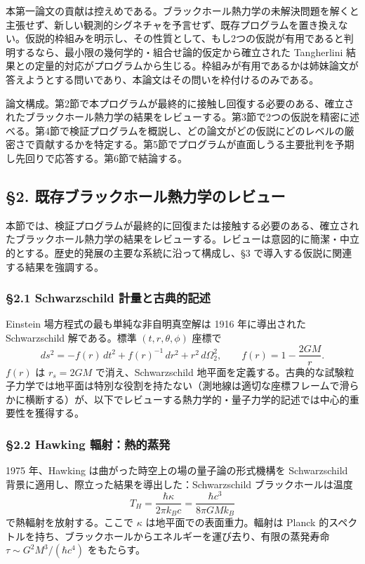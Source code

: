 \documentclass[a4paper,11pt]{ltjsarticle}
\theoremstyle{definition}
\begin{document}
本第一論文の貢献は控えめである。ブラックホール熱力学の未解決問題を解くと主張せず、新しい観測的シグネチャを予言せず、既存プログラムを置き換えない。仮説的枠組みを明示し、その性質として、もし2つの仮説が有用であると判明するなら、最小限の幾何学的・組合せ論的仮定から確立された
Tangherlini
結果との定量的対応がプログラムから生じる。枠組みが有用であるかは姉妹論文が答えようとする問いであり、本論文はその問いを枠付けるのみである。

論文構成。第2節で本プログラムが最終的に接触し回復する必要のある、確立されたブラックホール熱力学の結果をレビューする。第3節で2つの仮説を精密に述べる。第4節で検証プログラムを概説し、どの論文がどの仮説にどのレベルの厳密さで貢献するかを特定する。第5節でプログラムが直面しうる主要批判を予期し先回りで応答する。第6節で結論する。

\subsection{§2.
既存ブラックホール熱力学のレビュー}\label{ux65e2ux5b58ux30d6ux30e9ux30c3ux30afux30dbux30fcux30ebux71b1ux529bux5b66ux306eux30ecux30d3ux30e5ux30fc}

本節では、検証プログラムが最終的に回復または接触する必要のある、確立されたブラックホール熱力学の結果をレビューする。レビューは意図的に簡潔・中立的とする。歴史的発展の主要な系統に沿って構成し、§3
で導入する仮説に関連する結果を強調する。

\subsubsection{§2.1 Schwarzschild
計量と古典的記述}\label{schwarzschild-ux8a08ux91cfux3068ux53e4ux5178ux7684ux8a18ux8ff0}

Einstein 場方程式の最も単純な非自明真空解は 1916 年に導出された
Schwarzschild 解である。標準 \((t, r, \theta, \phi)\) 座標で
\[ds^2 = -f(r)\, dt^2 + f(r)^{-1}\, dr^2 + r^2 \, d\Omega_2^2, \qquad f(r) = 1 - \frac{2GM}{r}.\]
\(f(r)\) は \(r_s = 2GM\) で消え、Schwarzschild
地平面を定義する。古典的な試験粒子力学では地平面は特別な役割を持たない（測地線は適切な座標フレームで滑らかに横断する）が、以下でレビューする熱力学的・量子力学的記述では中心的重要性を獲得する。

\subsubsection{§2.2 Hawking
輻射：熱的蒸発}\label{hawking-ux8f3bux5c04ux71b1ux7684ux84b8ux767a}

1975 年、Hawking は曲がった時空上の場の量子論の形式機構を Schwarzschild
背景に適用し、際立った結果を導出した：Schwarzschild ブラックホールは温度
\[T_H = \frac{\hbar \kappa}{2\pi k_B c} = \frac{\hbar c^3}{8\pi G M k_B}\]
で熱輻射を放射する。ここで \(\kappa\) は地平面での表面重力。輻射は
Planck
的スペクトルを持ち、ブラックホールからエネルギーを運び去り、有限の蒸発寿命
\(\tau \sim G^2 M^3 / (\hbar c^4)\) をもたらす。
\end{document}
